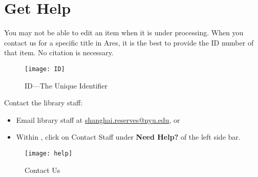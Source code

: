 \chapter{Get Help}
\label{ch:help}
You may not be able to edit an item when it is under processing. When you contact us for a specific title in Ares, it is the best to provide the \ares ID number of that item. No citation is necessary. 

\vspace*{3ex}
\begin{figure}[h]
    \centering
    \texttt{[image: ID]}
    \caption{\ares ID---The Unique Identifier}
    \label{fig:item ID}
\end{figure}
\vspace*{3ex}

Contact the library staff:
\begin{itemize}
    \item Email library staff at \href{mailto:shanghai.reserves@nyu.edu}{shanghai.reserves@nyu.edu}, or
    \item Within \ares,  click on {\imp Contact Staff} under \textbf{Need Help?} of the left side bar. 
\end{itemize}



\vspace*{3ex}
\begin{figure}[h]
    \centering
    \texttt{[image: help]}
    \caption{Contact Us}
    \label{fig:contact}
\end{figure}

